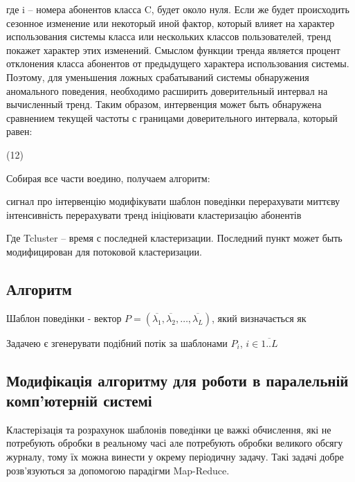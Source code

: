 где i – номера абонентов класса C, будет около нуля. Если же будет происходить сезонное изменение или некоторый иной фактор, который влияет на характер использования системы класса или нескольких классов пользователей, тренд покажет характер этих изменений.
Смыслом функции тренда является процент отклонения класса абонентов от предыдущего характера использования системы. Поэтому, для уменьшения ложных срабатываний системы обнаружения аномального поведения, необходимо расширить доверительный интервал на вычисленный тренд.
Таким образом, интервенция может быть обнаружена сравнением текущей частоты с границами доверительного интервала, который равен:

(12)

Собирая все части воедино, получаем алгоритм:

\begin{algorithm}[H]
\SetAlgoLined

   {
     {
      сигнал про інтервенцію\;
    }
   модифікувати шаблон поведінки\;
   перерахувати миттєву інтенсивність\;
   перерахувати тренд\;
    {
    ініціювати кластеризацію абонентів\;
   }
  }

\end{algorithm}
Где Tcluster – время с последней кластеризации. 
Последний пункт может быть модифицирован для потоковой кластеризации.


    \subsection{Алгоритм}

  Шаблон поведінки - вектор
  $P = (\overline{\lambda_1}, \overline{\lambda_2}, \dots, \overline{\lambda_L})$,
  який визначається як 

Задачею є згенерувати подібний потік за шаблонами $P_i$, $i \in \overline{1..L} $

	\subsection{Модифікація алгоритму для роботи в паралельній комп'ютерній системі}

	Кластерізація та розрахунок шаблонів поведінки це важкі обчислення, які не потребують обробки в реальному часі але потребують обробки великого обсягу журналу, тому їх можна винести у окрему періодичну задачу. Такі задачі добре розв'язуються за допомогою парадігми Map-Reduce.

